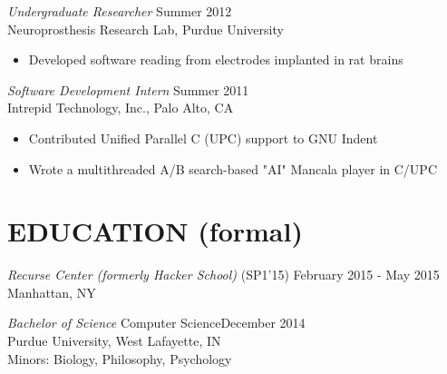 \documentclass[margin,4pt]{res} %
\begin{document}
\begin{resume}

	{\sl Undergraduate Researcher} \hfill Summer 2012\\
          Neuroprosthesis Research Lab, Purdue University
	    	\begin{itemize} \itemsep -2pt
	    	\item Developed software reading from electrodes implanted in rat brains
	    	\end{itemize}

	{\sl Software Development Intern} \hfill Summer 2011\\
          Intrepid Technology, Inc., Palo Alto, CA
          \begin{itemize}  \itemsep -2pt
		\item Contributed Unified Parallel C (UPC) support to GNU Indent
		\item Wrote a multithreaded A/B search-based "AI" Mancala player in C/UPC
		\end{itemize}


\section{EDUCATION (formal)}
	{\sl Recurse Center (formerly Hacker School)} \hfill (SP1'15) February 2015 - May 2015\\
		Manhattan, NY

	{\sl Bachelor of Science} Computer Science\hfill  December 2014\\
		Purdue University, West Lafayette, IN\\
		Minors: Biology, Philosophy, Psychology \\
%


\end{resume}
\end{document}
